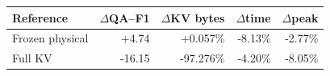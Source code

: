 \begin{tabular}{lrrrr}
\toprule
Reference & $\Delta$QA--F1 & $\Delta$KV bytes & $\Delta$time & $\Delta$peak \\
\midrule
Frozen physical & +4.74 & +0.057\% & -8.13\% & -2.77\% \\
Full KV & -16.15 & -97.276\% & -4.20\% & -8.05\% \\
\bottomrule
\end{tabular}
